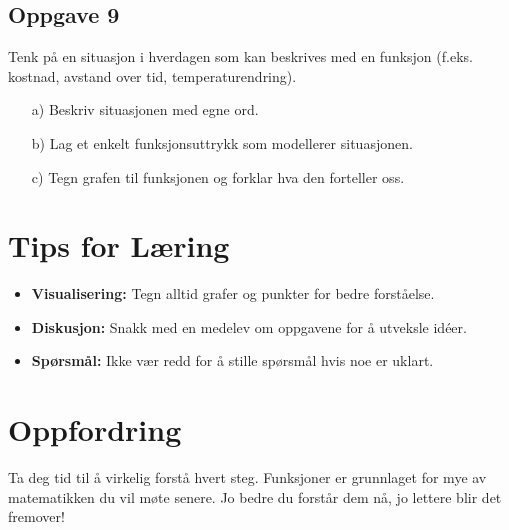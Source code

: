 \documentclass[12pt]{article}
\begin{document}
\subsection*{Oppgave 9}

Tenk på en situasjon i hverdagen som kan beskrives med en funksjon (f.eks. kostnad, avstand over tid, temperaturendring).

\begin{enumerate}
    \item[a)] Beskriv situasjonen med egne ord.
    \item[b)] Lag et enkelt funksjonsuttrykk som modellerer situasjonen.
    \item[c)] Tegn grafen til funksjonen og forklar hva den forteller oss.
\end{enumerate}

\section*{Tips for Læring}

\begin{itemize}
    \item \textbf{Visualisering:} Tegn alltid grafer og punkter for bedre forståelse.
    \item \textbf{Diskusjon:} Snakk med en medelev om oppgavene for å utveksle idéer.
    \item \textbf{Spørsmål:} Ikke vær redd for å stille spørsmål hvis noe er uklart.
\end{itemize}

\section*{Oppfordring}

Ta deg tid til å virkelig forstå hvert steg. Funksjoner er grunnlaget for mye av matematikken du vil møte senere. Jo bedre du forstår dem nå, jo lettere blir det fremover!
\end{document}
